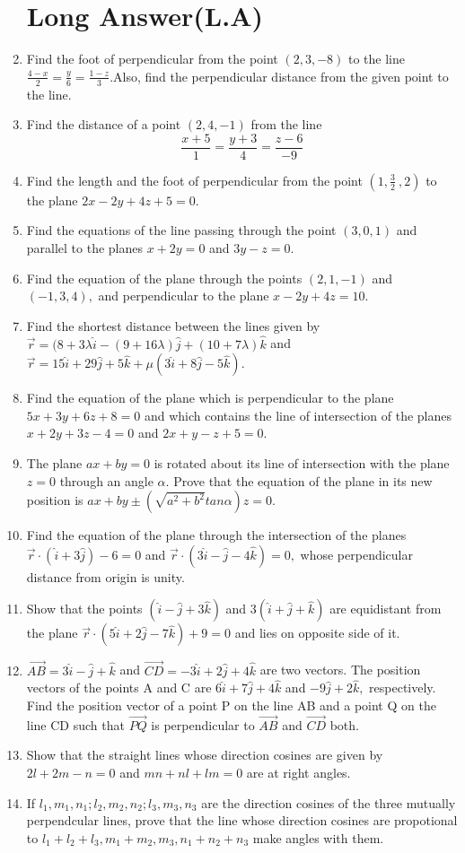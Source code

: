 \documentclass[12pt]{article}
\begin{document}
\begin{enumerate}
\section*{Long Answer(L.A)}
\item Find the foot of perpendicular from the point $(2,3,-8)$ to the line \(\displaystyle \frac{4-x}{2}=\frac{y}{6}=\frac{1-z}{3}\).Also, find the perpendicular distance from the given point to the line.
\item Find the distance of a point $(2,4,-1)$ from the line $$\frac{x+5}{1}=\frac{y+3}{4}=\frac{z-6}{-9}$$
\item Find the length and the foot of perpendicular from the point $\left(  1, \displaystyle \frac{3}{2}\ ,2  \right)$ to the plane $2x-2y+4z+5=0.$
\item Find the equations of the line passing through the point $(3,0,1)$ and parallel to the planes $x+2y=0$ and $3y-z=0.$
\item Find the equation of the plane through the points $(2,1,-1)$ and $(-1,3,4),$ and 
perpendicular to the plane $x-2y+4z=10.$
\item Find the shortest distance between the lines given by $\overrightarrow{r}=(8+3\lambda\hat{i}-(9+16\lambda)\hat{j}+(10+7\lambda)\hat{k}$ and $\overrightarrow{r}=15\hat{i}+29\hat{j}+5\hat{k}+\mu(3\hat{i}+8\hat{j}-5\hat{k}).$
\item Find the equation of the plane which is perpendicular to the plane $5x+3y+6z+8=0$ and which contains the line of intersection of the planes $x+2y+3z-4=0$ and $2x+y-z+5=0.$
\item The plane $ax+by=0$ is rotated about its line of intersection with the plane $z=0$ through an angle $\alpha.$ Prove that the equation of the plane in its new position is $ax+by \pm (\sqrt{a^2+b^2} tan\alpha)z=0.$
\item Find the equation of the plane through the intersection of the planes $\overrightarrow{r} \cdot (\hat{i}+3\hat{j}) - 6=0$ and $\overrightarrow{r} \cdot (3\hat{i}-\hat{j}-4\hat{k})=0,$ whose perpendicular distance from origin is unity.
\item Show that the points $(\hat{i}-\hat{j}+3\hat{k})$ and $3(\hat{i}+\hat{j}+\hat{k})$ are equidistant from the plane $\overrightarrow{r} \cdot (5\hat{i}+2\hat{j}-7\hat{k})+9=0$ and lies on opposite side of it.
\item $\overrightarrow{AB}=3\hat{i}-\hat{j}+\hat{k}$ and $\overrightarrow{CD}=-3\hat{i}+2\hat{j}+4\hat{k}$ are two vectors. The position vectors of the points A and C are $6\hat{i}+7\hat{j}+4\hat{k}$ and $-9\hat{j}+2\hat{k},$ respectively. Find the position vector of a point P on the line AB and a point Q on the line CD such that $\overrightarrow{PQ}$ is perpendicular to $\overrightarrow{AB}$ and $\overrightarrow{CD}$ both.
\item Show that the straight lines whose direction cosines are given by $2l+2m-n=0$ and $mn+nl+lm=0$ are at right angles.
\item If $l_1, m_1, n_1;l_2, m_2, n_2;l_3, m_3, n_3$ are the direction cosines of the three mutually perpendcular lines, prove that the line whose direction cosines are propotional to $l_1+l_2+l_3 , m_1+m_2,m_3, n_1+n_2+n_3$ make angles with them.


\end{enumerate}
\end{document}
